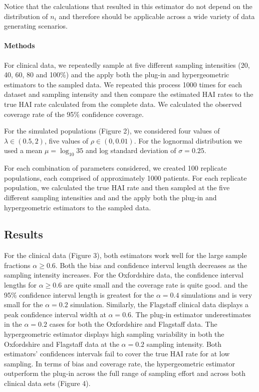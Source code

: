 \documentclass[]{article}
\let\oldparagraph\paragraph
\renewcommand{\paragraph}[1]{\oldparagraph{#1}\mbox{}}
\begin{document}
Notice that the calculations that resulted in this estimator do not
depend on the distribution of \(n_i\) and therefore should be applicable
across a wide variety of data generating scenarios.

\hypertarget{methods}{%
\paragraph{Methods}\label{methods}}

For clinical data, we repeatedly sample at five different sampling
intensities (20, 40, 60, 80 and 100\%) and the apply both the plug-in
and hypergeometric estimators to the sampled data. We repeated this
process 1000 times for each dataset and sampling intensity and then
compare the estimated HAI rates to the true HAI rate calculated from the
complete data. We calculated the observed coverage rate of the 95\%
confidence coverage.

For the simulated populations (Figure 2), we considered four values of
\(\lambda \in (0.5, 2)\), five values of \(\rho \in (0, 0.01)\). For the
lognormal distribution we used a mean \(\mu = \log_{10}35\) and log
standard deviation of \(\sigma = 0.25\).

For each combination of parameters considered, we created 100 replicate
populations, each comprised of approximately 1000 patients. For each
replicate population, we calculated the true HAI rate and then sampled
at the five different sampling intensities and and the apply both the
plug-in and hypergeometric estimators to the sampled data.

\hypertarget{results}{%
\subsection{Results}\label{results}}

For the clinical data (Figure 3), both estimators work well for the
large sample fractions \(\alpha \ge 0.6\). Both the bias and confidence
interval length decreases as the sampling intensity increases. For the
Oxfordshire data, the confidence interval lengths for \(\alpha \ge 0.6\)
are quite small and the coverage rate is quite good. and the 95\%
confidence interval length is greatest for the \(\alpha = 0.4\)
simulations and is very small for the \(\alpha=0.2\) simulation.
Similarly, the Flagstaff clinical data displays a peak confidence
interval width at \(\alpha = 0.6\). The plug-in estimator underestimates
in the \(\alpha = 0.2\) cases for both the Oxfordshire and Flagstaff
data. The hypergeometric estimator displays high sampling variability in
both the Oxfordshire and Flagstaff data at the \(\alpha = 0.2\) sampling
intensity. Both estimators' confidences intervals fail to cover the true
HAI rate for at low sampling. In terms of bias and coverage rate, the
hypergeometric estimator outperform the plug-in across the full range of
sampling effort and across both clinical data sets (Figure 4).
\end{document}
